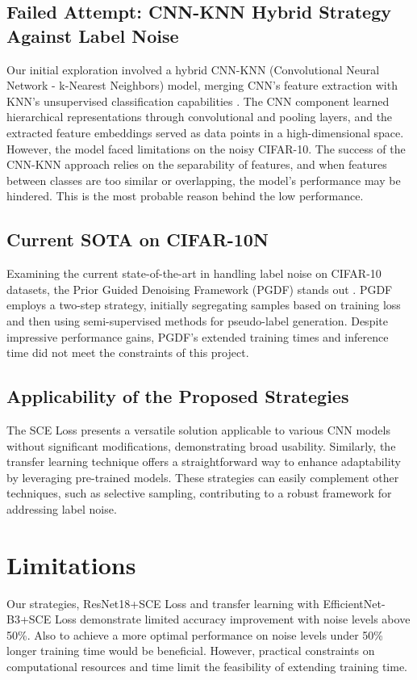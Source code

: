 \documentclass[11pt,twocolumn,letterpaper]{article}
\begin{document}
\subsection*{Failed Attempt: CNN-KNN Hybrid Strategy Against Label Noise}
Our initial exploration involved a hybrid CNN-KNN (Convolutional Neural Network - k-Nearest Neighbors) model, merging CNN's feature extraction with KNN's unsupervised classification capabilities \cite{sejutiHybridCNNKNN2023a}. The CNN component learned hierarchical representations through convolutional and pooling layers, and the extracted feature embeddings served as data points in a high-dimensional space. However, the model faced limitations on the noisy CIFAR-10. The success of the CNN-KNN approach relies on the separability of features, and when features between classes are too similar or overlapping, the model's performance may be hindered. This is the most probable reason behind the low performance. 

\subsection*{Current SOTA on CIFAR-10N}
Examining the current state-of-the-art in handling label noise on CIFAR-10 datasets, the Prior Guided Denoising Framework (PGDF) stands out \cite{PapersCodeCIFAR100N}. PGDF employs a two-step strategy, initially segregating samples based on training loss and then using semi-supervised methods for pseudo-label generation. Despite impressive performance gains, PGDF's extended training times and inference time did not meet the constraints of this project.

\subsection*{Applicability of the Proposed Strategies}
The SCE Loss presents a versatile solution applicable to various CNN models without significant modifications, demonstrating broad usability. Similarly, the transfer learning technique offers a straightforward way to enhance adaptability by leveraging pre-trained models. These strategies can easily complement other techniques, such as selective sampling, contributing to a robust framework for addressing label noise.


\section{Limitations}
Our strategies, ResNet18+SCE Loss and transfer learning with EfficientNet-B3+SCE Loss demonstrate limited accuracy improvement with noise levels above 50\%. Also to achieve a more optimal performance on noise levels under 50\% longer training time would be beneficial. However, practical constraints on computational resources and time limit the feasibility of extending training time.
\end{document}
